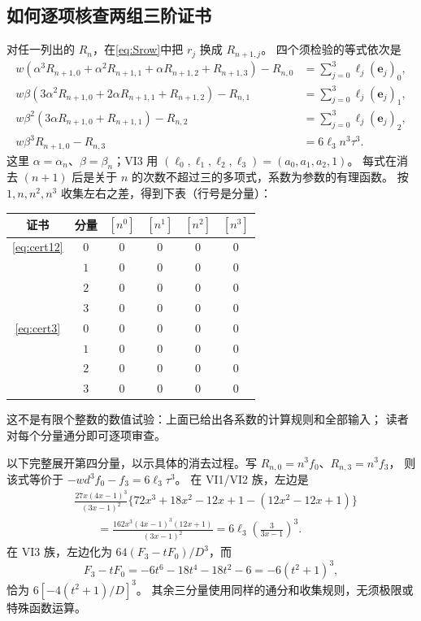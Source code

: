\documentclass[11pt,a4paper]{article}
\numberwithin{equation}{section}
\theoremstyle{remark}\newtheorem{remark}[theorem]{说明}
\newcommand{\ee}{\boldsymbol e}
\begin{document}
\subsection{如何逐项核查两组三阶证书}
对任一列出的 $R_n$，在\eqref{eq:Srow}中把 $r_j$ 换成 $R_{n+1,j}$。
四个须检验的等式依次是
\begin{align*}
 w(\alpha^3R_{n+1,0}+\alpha^2R_{n+1,1}+\alpha R_{n+1,2}+R_{n+1,3})-R_{n,0}
 &=\sum_{j=0}^3\ell_j(\ee_j)_0,\\
 w\beta(3\alpha^2R_{n+1,0}+2\alpha R_{n+1,1}+R_{n+1,2})-R_{n,1}
 &=\sum_{j=0}^3\ell_j(\ee_j)_1,\\
 w\beta^2(3\alpha R_{n+1,0}+R_{n+1,1})-R_{n,2}
 &=\sum_{j=0}^3\ell_j(\ee_j)_2,\\
 w\beta^3R_{n+1,0}-R_{n,3}&=6\ell_3n^3\tau^3.
\end{align*}
这里 $\alpha=\alpha_n$、$\beta=\beta_n$；VI3 用 $(\ell_0,\ell_1,\ell_2,\ell_3)=(a_0,a_1,a_2,1)$。
每式在消去 $(n+1)$ 后是关于 $n$ 的次数不超过三的多项式，系数为参数的有理函数。
按 $1,n,n^2,n^3$ 收集左右之差，得到下表（行号是分量）：
\begin{center}\begin{tabular}{c c c c c c}\toprule
 证书 & 分量 & $[n^0]$ & $[n^1]$ & $[n^2]$ & $[n^3]$\\\midrule
 \eqref{eq:cert12} & $0$ & $0$ & $0$ & $0$ & $0$\\
                  & $1$ & $0$ & $0$ & $0$ & $0$\\
                  & $2$ & $0$ & $0$ & $0$ & $0$\\
                  & $3$ & $0$ & $0$ & $0$ & $0$\\\midrule
 \eqref{eq:cert3}  & $0$ & $0$ & $0$ & $0$ & $0$\\
                  & $1$ & $0$ & $0$ & $0$ & $0$\\
                  & $2$ & $0$ & $0$ & $0$ & $0$\\
                  & $3$ & $0$ & $0$ & $0$ & $0$\\\bottomrule
\end{tabular}\end{center}
这不是有限个整数的数值试验：上面已给出各系数的计算规则和全部输入；
读者对每个分量通分即可逐项审查。

以下完整展开第四分量，以示具体的消去过程。写 $R_{n,0}=n^3f_0$、$R_{n,3}=n^3f_3$，
则该式等价于 $-wd^3f_0-f_3=6\ell_3\tau^3$。
在 VI1/VI2 族，左边是
\begin{align*}
 &\frac{27x(4x-1)^3}{(3x-1)^2}
  \{72x^3+18x^2-12x+1-(12x^2-12x+1)\}\\
 &\qquad=\frac{162x^3(4x-1)^3(12x+1)}{(3x-1)^2}
 =6\ell_3\left(\frac3{3x-1}\right)^3.
\end{align*}
在 VI3 族，左边化为 $64(F_3-tF_0)/D^3$，而
\[
 F_3-tF_0=-6t^6-18t^4-18t^2-6=-6(t^2+1)^3,
\]
恰为 $6[-4(t^2+1)/D]^3$。
其余三分量使用同样的通分和收集规则，无须极限或特殊函数运算。
\end{document}
